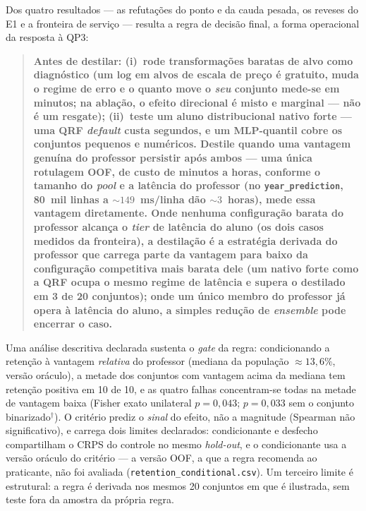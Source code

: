 Dos quatro resultados --- as refutações do ponto e da cauda
pesada, os reveses do E1 e a fronteira de serviço --- resulta a
regra de decisão final, a forma operacional da resposta à QP3:

\begin{quote}
\textbf{Antes de destilar: (i)~rode transformações baratas de alvo
como diagnóstico (um log em alvos de escala de preço é gratuito,
muda o regime de erro e o quanto move o \emph{seu} conjunto mede-se
em minutos; na ablação, o efeito direcional é misto e marginal ---
não é um resgate); (ii)~teste um aluno distribucional nativo forte
--- uma QRF \emph{default} custa segundos, e um MLP-quantil cobre os
conjuntos pequenos e numéricos. Destile quando uma vantagem genuína do
professor persistir após ambos --- uma única rotulagem OOF, de custo de
minutos a horas, conforme o tamanho do \emph{pool} e a latência do
professor (no \texttt{year\_\allowbreak prediction}, 80~mil linhas a
${\sim}149$~ms/linha dão ${\sim}3$~horas), mede essa vantagem
diretamente. Onde nenhuma configuração
barata do professor alcança o \emph{tier} de latência do aluno (os
dois casos medidos da fronteira), a
destilação é a estratégia derivada do professor que carrega parte da
vantagem para
baixo da configuração competitiva mais barata dele (um nativo forte
como a QRF ocupa o mesmo regime de latência e supera o destilado em
3 de 20 conjuntos); onde um único membro do professor já opera à
latência do
aluno, a simples redução de \emph{ensemble} pode encerrar o caso.}
\end{quote}

Uma análise descritiva declarada sustenta o \emph{gate} da regra:
condicionando a retenção à vantagem \emph{relativa} do professor
(mediana da população ${\approx}13{,}6\%$, versão oráculo), a
metade dos conjuntos com vantagem acima da mediana tem retenção
positiva em 10 de 10, e as quatro falhas concentram-se todas na metade
de vantagem baixa (Fisher exato unilateral $p{=}0{,}043$;
$p{=}0{,}033$ sem o conjunto binarizado$^\dagger$). O critério prediz
o \emph{sinal} do efeito, não a magnitude (Spearman não
significativo), e carrega dois limites declarados: condicionante e
desfecho compartilham o CRPS do controle no mesmo \emph{hold-out}, e
o condicionante usa a versão oráculo do critério --- a versão OOF,
a que a regra recomenda ao praticante, não foi avaliada
(\texttt{retention\_\allowbreak conditional.csv}). Um terceiro
limite é estrutural: a regra é derivada nos mesmos 20 conjuntos em
que é ilustrada, sem teste fora da amostra da própria regra.

